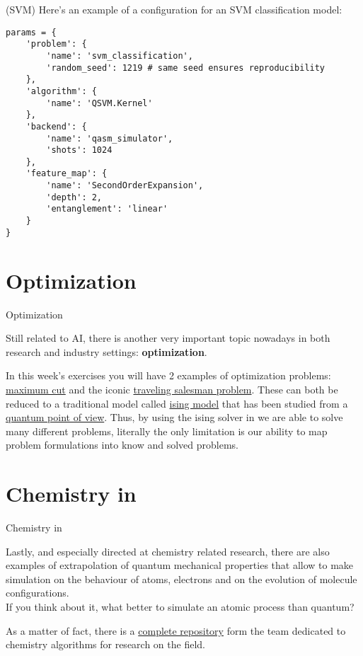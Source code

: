 \documentclass[aspectratio=43]{beamer}
\begin{document}
\begin{frame}[fragile]{\ai (SVM)}
\small{Here's an example of a configuration for an SVM classification model:}\begin{verbatim}
params = {
    'problem': {
        'name': 'svm_classification',
        'random_seed': 1219 # same seed ensures reproducibility
    },
    'algorithm': {
        'name': 'QSVM.Kernel'
    },
    'backend': {
        'name': 'qasm_simulator',
        'shots': 1024
    },
    'feature_map': {
        'name': 'SecondOrderExpansion',
        'depth': 2,
        'entanglement': 'linear'
    }
}
\end{verbatim}
\end{frame}

\section{Optimization}
\begin{frame}{Optimization}
\begin{cardTiny}
    Still related to AI, there is another very important topic nowadays in both research and industry settings: \textbf{optimization}.
\end{cardTiny}
\begin{cardTiny}
    In this week's exercises you will have 2 examples of optimization problems: \href{https://en.wikipedia.org/wiki/Maximum_cut}{maximum cut} and the iconic \href{https://en.wikipedia.org/wiki/Travelling_salesman_problem}{traveling salesman problem}. These can both be reduced to a traditional model called \href{https://en.wikipedia.org/wiki/Ising_model}{ising model} that has been studied from a \href{https://arxiv.org/ftp/arxiv/papers/1210/1210.0113.pdf}{quantum point of view}. Thus, by using the ising solver in \qka we are able to solve many different problems, literally the only limitation is our ability to map problem formulations into know and solved problems.
\end{cardTiny}
\pagenumber
\end{frame}




\section{Chemistry in \qka}
\begin{frame}{Chemistry in \qka}
\begin{card}
    Lastly, and especially directed at chemistry related research, there are also examples of extrapolation of quantum mechanical properties that allow to make simulation on the behaviour of atoms, electrons and on the evolution of molecule configurations.\\ If you think about it, what better to simulate an atomic process than quantum?
\end{card}
\begin{card}
    As a matter of fact, there is a \href{https://github.com/Qiskit/aqua-chemistry}{complete repository} form the \qk team dedicated to chemistry algorithms for research on the field.
\end{card}
\pagenumber
\end{frame}
\end{document}
